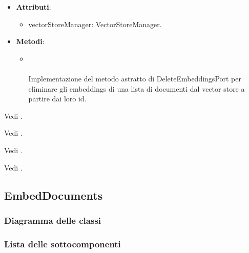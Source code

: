 \documentclass[10pt, a4paper]{article}
\begin{document}
\label{DeleteEmbeddingsVectorStoreDettaglio}
\begin{itemize}
    \item \textbf{Attributi}:
    \begin{itemize}
        \item vectorStoreManager: VectorStoreManager.
    \end{itemize}
    \item \textbf{Metodi}:
    \begin{itemize}
        \item {}\\ \\
        Implementazione del metodo astratto di DeleteEmbeddingsPort per eliminare gli embeddings di una lista di documenti dal vector store a partire dai loro id.
    \end{itemize}
\end{itemize}

Vedi .

Vedi .

Vedi .

Vedi .


\subsection{EmbedDocuments}
\subsubsection{Diagramma delle classi}
\subsubsection{Lista delle sottocomponenti}
\end{document}
